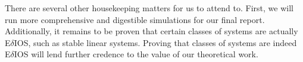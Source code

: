 \documentclass{l4dc2026}
\newcommand{\norm}[1]{\lVert#1\rVert}
\newcommand{\col}{\operatorname{col}}
\begin{document}
There are several other housekeeping matters for us to attend to. First, we will run more comprehensive and digestible simulations for our final report. Additionally, it remains to be proven that certain classes of systems are actually E$\delta$IOS, such as stable linear systems. Proving that classes of systems are indeed E$\delta$IOS will lend further credence to the value of our theoretical work.




\end{document}
